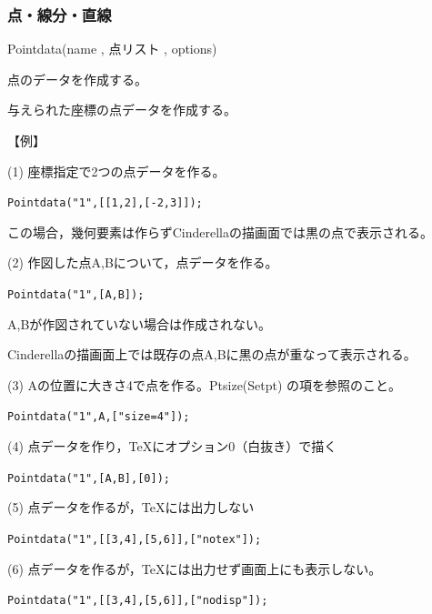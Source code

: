 \documentclass[papersize,a4paper,12pt,uplatex]{jsarticle}
\begin{document}
\subsubsection{点・線分・直線}
\begin{description}

\vspace{\baselineskip}
\hypertarget{pointdata}{}
\item[関数]  Pointdata(name , 点リスト , options)
\item[機能]  点のデータを作成する。
\item[説明]  与えられた座標の点データを作成する。

\vspace{\baselineskip}
【例】

(1) 座標指定で2つの点データを作る。

\hspace{10mm} \verb|Pointdata("1",[[1,2],[-2,3]]);|

\hspace{5mm}この場合，幾何要素は作らずCinderellaの描画面では黒の点で表示される。

(2) 作図した点A,Bについて，点データを作る。

\hspace{10mm} \verb|Pointdata("1",[A,B]);|
      
\hspace{5mm}A,Bが作図されていない場合は作成されない。

\hspace{5mm}Cinderellaの描画面上では既存の点A,Bに黒の点が重なって表示される。

(3) Aの位置に大きさ4で点を作る。Ptsize(Setpt) の項を参照のこと。

\hspace{10mm} \verb|Pointdata("1",A,["size=4"]);|
      
(4) 点データを作り，TeXにオプション0（白抜き）で描く

\hspace{10mm}  \verb|Pointdata("1",[A,B],[0]);|
      
(5) 点データを作るが，TeXには出力しない

\hspace{10mm}  \verb|Pointdata("1",[[3,4],[5,6]],["notex"]);|

(6)  点データを作るが，TeXには出力せず画面上にも表示しない。
        
\hspace{10mm} \verb|Pointdata("1",[[3,4],[5,6]],["nodisp"]);|


\end{description}
\end{document}
